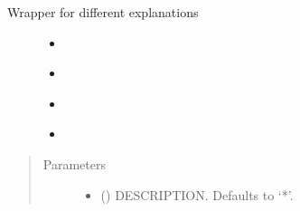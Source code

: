 \documentclass[letterpaper,10pt,english]{sphinxmanual}
\begin{document}
\begin{fulllineitems}
\begin{fulllineitems}
\label{\detokenize{attribution/modeldekom:modeldekom.totdif.totexplain}}
\pysigstartsignatures
{}
\pysigstopsignatures\begin{description}
\item[{Wrapper for different explanations}] \leavevmode\begin{itemize}
\item {} 
\sphinxAtStartPar
{\hyperref[\detokenize{attribution/modeldekom:modeldekom.totdif.explain_last}]{}}

\item {} 
\sphinxAtStartPar
{\hyperref[\detokenize{attribution/modeldekom:modeldekom.totdif.explain_per}]{}}

\item {} 
\sphinxAtStartPar
{\hyperref[\detokenize{attribution/modeldekom:modeldekom.totdif.explain_sum}]{}}

\item {} 
\sphinxAtStartPar
{\hyperref[\detokenize{attribution/modeldekom:modeldekom.totdif.explain_all}]{}}

\end{itemize}

\end{description}
\begin{quote}\begin{description}
\item[{Parameters}] \leavevmode\begin{itemize}
\item {} 
\sphinxAtStartPar
{} (\sphinxstyleliteralemphasis{\sphinxupquote{, }}) \textendash{} DESCRIPTION. Defaults to ‘*’.


\end{itemize}
\end{description}
\end{quote}
\end{fulllineitems}
\end{fulllineitems}
\end{document}
